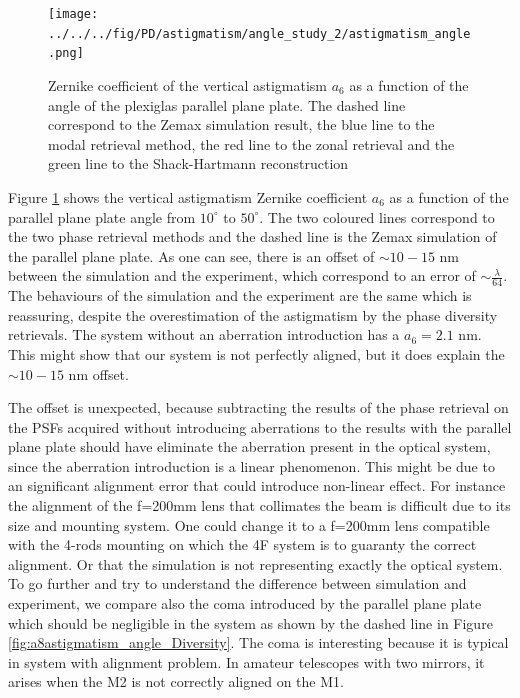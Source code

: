 \begin{figure}
\begin{center}
\texttt{[image: ../../../fig/PD/astigmatism/angle\_study\_2/astigmatism\_angle.png]}
\decoRule
\caption{Zernike coefficient of the vertical astigmatism $a_6$ as a function of the angle of the plexiglas parallel plane plate. The dashed line correspond to the Zemax simulation result, the blue line to the modal retrieval method, the red line to the zonal retrieval and the green line to the Shack-Hartmann reconstruction}
\label{fig:astigmatism_angle_Diversity}
\end{center}
\end{figure}

Figure \ref{fig:astigmatism_angle_Diversity} shows the vertical astigmatism Zernike coefficient $a_6$ as a function of the parallel plane plate angle from $10^{\circ}$ to $50^{\circ}$. The two coloured lines correspond to the two phase retrieval methods and the dashed line is the Zemax simulation of the parallel plane plate. As one can see, there is an offset of $\sim 10-15$ nm between the simulation and the experiment, which correspond to an error of $\sim\frac{\lambda}{64}$. The behaviours of the simulation and the experiment are the same which is reassuring, despite the overestimation of the astigmatism by the phase diversity retrievals. The system without an aberration introduction has a $ a_6 = 2.1$ nm. This might show that our system is not perfectly aligned, but it does explain the $\sim 10-15$ nm offset.

The offset is unexpected, because subtracting the results of the phase retrieval on the PSFs acquired without introducing aberrations to the results with the parallel plane plate should have eliminate the aberration present in the optical system, since the aberration introduction is a linear phenomenon. This might be due to an significant alignment error that could introduce non-linear effect. For instance the alignment of the f=200mm lens that collimates the beam is difficult due to its size and mounting system. One could change it to a f=200mm lens compatible with the 4-rods mounting on which the 4F system is to guaranty the correct alignment. Or that the simulation is not representing exactly the optical system. To go further and try to understand the difference between simulation and experiment, we compare also the coma introduced by the parallel plane plate which should be negligible in the system as shown by the dashed line in Figure \ref{fig:a8astigmatism_angle_Diversity}. The coma is interesting because it is typical in system with alignment problem. In amateur telescopes with two mirrors, it arises when the M2 is not correctly aligned on the M1.

